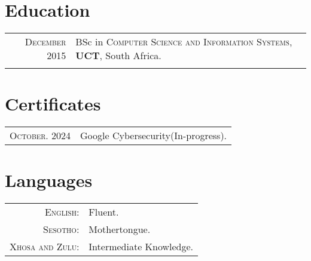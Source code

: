 \documentclass[a4paper,10pt]{article} %
\begin{document}

\section{Education}

\begin{tabular}{rl}	
\textsc{December} 2015 & BSc in \textsc{Computer Science and Information Systems}, \textbf{UCT}, South Africa.\\
&\\
\end{tabular}


\section{Certificates}

\begin{tabular}{rl}
\textsc{October.} 2024 & Google Cybersecurity(In-progress).\\
\end{tabular}


\section{Languages}

\begin{tabular}{rl}
\textsc{English:} & Fluent.\\
\textsc{Sesotho:} & Mothertongue.\\
\textsc{Xhosa and Zulu:} & Intermediate Knowledge.\\
\end{tabular}

\end{document}
